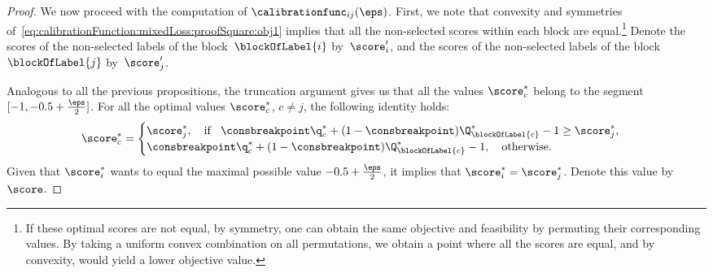 \documentclass{article}
\begin{document}
\begin{proof}
    We now proceed with the computation of $\calibrationfunc_{ij}(\eps)$.
    First, we note that convexity and symmetries of~\eqref{eq:calibrationFunction:mixedLoss:proofSquare:obj1} implies that all the non-selected scores within each block are equal.\footnote{If these optimal scores are not equal, by symmetry, one can obtain the same objective and feasibility by permuting their corresponding values. By taking a uniform convex combination on all permutations, we obtain a point where all the scores are equal, and by convexity, would yield a lower objective value.}
    Denote the scores of the non-selected labels of the block~$\blockOfLabel{i}$ by~$\score_i'$, and the scores of the non-selected labels of the block~$\blockOfLabel{j}$ by~$\score_j'$.
    
    Analogous to all the previous propositions, the truncation argument gives us that all the values $\score_c^*$ belong to the segment~$[-1, -0.5 + \frac{\eps}{2}]$.
    For all the optimal values $\score_c^*$, $c \neq j$, the following identity holds:
    \[
    \score_c^* = \begin{cases}
    \score_j^*, \quad \text{if\;\; $\consbreakpoint \q_c^* + (1-\consbreakpoint)\Q_{\blockOfLabel{c}}^*-1 \geq \score_j^*$},\\
    \consbreakpoint \q_c^* + (1-\consbreakpoint)\Q_{\blockOfLabel{c}}^*-1, \quad \text{otherwise}.
    \end{cases}
    \]
    Given that $\score_i^*$ wants to equal the maximal possible value $-0.5 + \frac{\eps}{2}$, it implies that $\score_i^* = \score_j^*$.
    Denote this value by~$\score$.
    

\end{proof}
\end{document}

